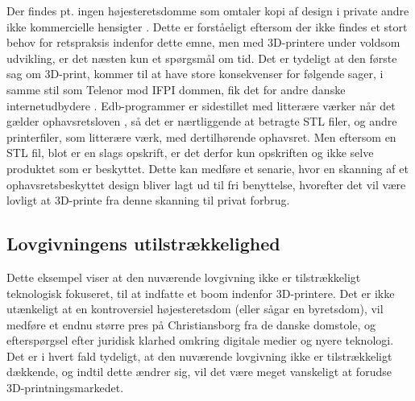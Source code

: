 Der findes pt. ingen højesteretsdomme som omtaler kopi af design i private andre ikke kommercielle hensigter \cite{jura5}. Dette er forståeligt eftersom der ikke findes et stort behov for retspraksis indenfor dette emne, men med 3D-printere under voldsom udvikling, er det næsten kun et spørgsmål om tid. Det er tydeligt at den første sag om 3D-print, kommer til at have store konsekvenser for følgende sager, i samme stil som Telenor mod IFPI dommen, fik det for andre danske internetudbydere \cite{jura6}.
Edb-programmer er sidestillet med litterære værker når det gælder ophavsretsloven \cite{jura7}, så det er nærtliggende at betragte STL filer, og andre printerfiler, som litterære værk, med dertilhørende ophavsret. Men eftersom en STL fil, blot er en slags opskrift, er det derfor kun opskriften og ikke selve produktet som er beskyttet. Dette kan medføre et senarie, hvor en skanning af et ophavsretsbeskyttet design bliver lagt ud til fri benyttelse, hvorefter det vil være lovligt at 3D-printe fra denne skanning til privat forbrug.

\subsection{Lovgivningens utilstrækkelighed}
 
Dette eksempel viser at den nuværende lovgivning ikke er tilstrækkeligt teknologisk fokuseret, til at indfatte et boom indenfor 3D-printere. Det er ikke utænkeligt at en kontroversiel højesteretsdom (eller sågar en byretsdom), vil medføre et endnu større pres på Christiansborg fra de danske domstole, og efterspørgsel efter juridisk klarhed omkring digitale medier og nyere teknologi.
Det er i hvert fald tydeligt, at den nuværende lovgivning ikke er tilstrækkeligt dækkende, og indtil dette ændrer sig, vil det være meget vanskeligt at forudse 3D-printningsmarkedet.

